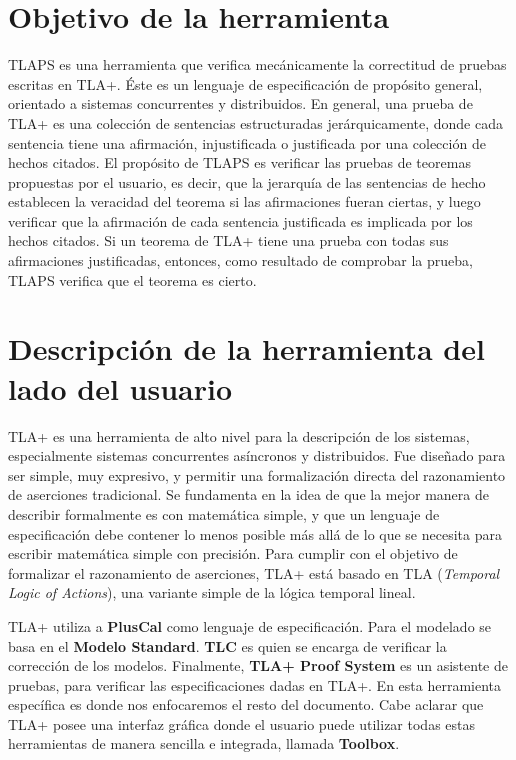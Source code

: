 \documentclass[spanish]{llncs}
\begin{document}


\section{Objetivo de la herramienta}

TLAPS es una herramienta que verifica mecánicamente la correctitud de pruebas escritas en TLA+.
Éste es un lenguaje de especificación de propósito general, orientado a sistemas concurrentes y distribuidos.\cite{highlevel}
En general, una prueba de TLA+ es una colección de sentencias estructuradas jerárquicamente,
donde cada sentencia tiene una afirmación, injustificada o justificada por una colección de hechos citados.
El propósito de TLAPS es verificar las pruebas de teoremas propuestas por el usuario, es decir,
que la jerarquía de las sentencias de hecho establecen la veracidad del teorema si las afirmaciones fueran ciertas,
y luego verificar que la afirmación de cada sentencia justificada es implicada por los hechos citados.\cite{tlaps}
Si un teorema de TLA+ tiene una prueba con todas sus afirmaciones justificadas, entonces, como resultado
de comprobar la prueba, TLAPS verifica que el teorema es cierto.

\section{Descripción de la herramienta del lado del usuario}

TLA+ es una herramienta de alto nivel para la descripción de los sistemas, especialmente sistemas concurrentes asíncronos y distribuidos. 
Fue diseñado para ser simple, muy expresivo, y permitir una formalización directa del razonamiento de aserciones tradicional.
Se fundamenta en la idea de que la mejor manera de describir formalmente es con matemática simple, y que un lenguaje de especificación debe contener lo menos posible más allá de lo que se necesita para escribir matemática simple con precisión.
Para cumplir con el objetivo de formalizar el razonamiento de aserciones, TLA+ está basado en TLA (\textit{Temporal Logic of Actions}), una variante simple de la lógica temporal lineal.

TLA+ utiliza a \textbf{PlusCal} como lenguaje de especificación.
Para el modelado se basa en el \textbf{Modelo Standard}.
\textbf{TLC} es quien se encarga de verificar la corrección de los modelos.
Finalmente, \textbf{TLA+ Proof System} es un asistente de pruebas, para verificar las especificaciones dadas en TLA+. 
En esta herramienta específica es donde nos enfocaremos el resto del documento. 
Cabe aclarar que TLA+ posee una interfaz gráfica donde el usuario puede utilizar todas estas herramientas de manera sencilla e integrada, llamada \textbf{Toolbox}.
  
\end{document}
